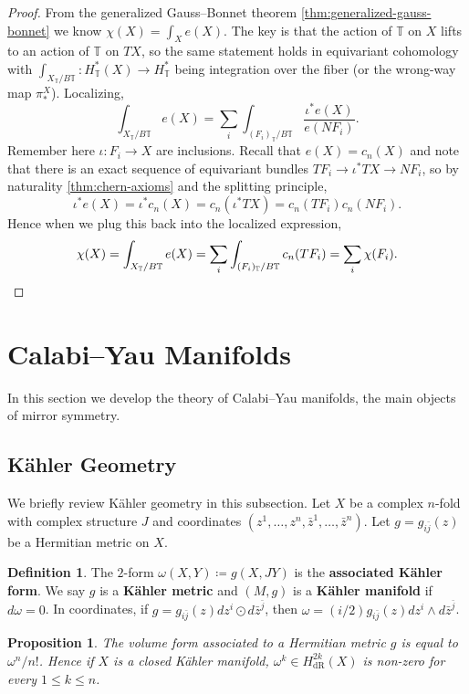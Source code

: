 \documentclass{report}
\theoremstyle{plain}
\newtheorem{proposition}[theorem]{Proposition}
\theoremstyle{definition}
\newtheorem{definition}[theorem]{Definition}
\theoremstyle{remark}
\newcommand{\bT}{\mathbb{T}}
\newcommand{\dR}{\mathrm{dR}}
\newcommand{\bz}{\bar{z}}
\begin{document}
\begin{proof}
  From the generalized Gauss--Bonnet theorem
  \ref{thm:generalized-gauss-bonnet} we know $\chi(X) = \int_X e(X)$.
  The key is that the action of $\bT$ on $X$ lifts to an action of
  $\bT$ on $TX$, so the same statement holds in equivariant cohomology
  with $\int_{X_{\bT}/B\bT}\colon H^*_{\bT}(X) \to H^*_{\bT}$ being
  integration over the fiber (or the wrong-way map $\pi^X_*$).
  Localizing,
  \[ \int_{X_{\bT}/B\bT} e(X) = \sum_i \int_{(F_i)_{\bT}/B\bT} \frac{\iota^* e(X)}{e(NF_i)}. \]
  Remember here $\iota\colon F_i \to X$ are inclusions. Recall that
  $e(X) = c_n(X)$ and note that there is an exact sequence of
  equivariant bundles $TF_i \to \iota^* TX \to NF_i$, so by
  naturality \ref{thm:chern-axioms} and the splitting principle,
  \[ \iota^* e(X) = \iota^* c_n(X) = c_n(\iota^* TX) = c_n(TF_i) c_n(NF_i). \]
  Hence when we plug this back into the localized expression,
  \[ \chi(X) = \int_{X_{\bT}/B\bT} e(X) = \sum_i \int_{(F_i)_{\bT}/B\bT} c_n(TF_i) = \sum_i \chi(F_i). \qedhere \]
\end{proof}

\section{Calabi--Yau Manifolds}

In this section we develop the theory of Calabi--Yau manifolds, the
main objects of mirror symmetry.

\subsection{K\"ahler Geometry}

We briefly review K\"ahler geometry in this subsection. Let $X$ be a
complex $n$-fold with complex structure $J$ and coordinates $(z^1,
\ldots, z^n, \bz^1, \ldots, \bz^n)$. Let $g = g_{i\bar{j}}(z)$ be a
Hermitian metric on $X$.

\begin{definition}
  The $2$-form $\omega(X, Y) \coloneqq g(X, JY)$ is the {\bf
    associated K\"ahler form}. We say $g$ is a {\bf K\"ahler metric}
  and $(M, g)$ is a {\bf K\"ahler manifold} if $d\omega = 0$. In
  coordinates, if $g = g_{i\bar{j}}(z) dz^i \odot d\bz^{\bar{j}}$,
  then $\omega = (i/2)g_{i\bar{j}}(z) dz^i \wedge d\bz^{\bar{j}}$.
\end{definition}

\begin{proposition} \label{thm:lefschetz-nonzero}
  The volume form associated to a Hermitian metric $g$ is equal to
  $\omega^n/n!$. Hence if $X$ is a closed K\"ahler manifold, $\omega^k
  \in H^{2k}_{\dR}(X)$ is non-zero for every $1 \le k \le n$.
\end{proposition}
\end{document}
